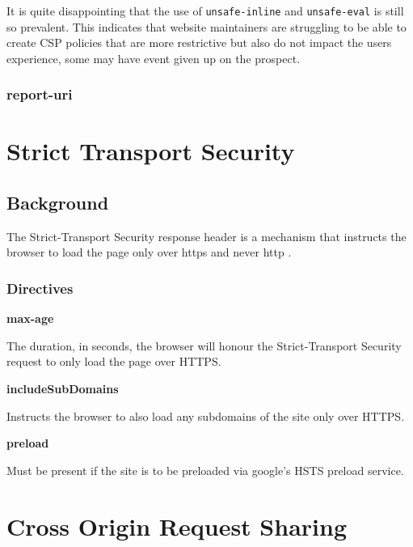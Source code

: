 \documentclass{mscreport}
\begin{document}
\vspace{0.3cm} \noindent
It is quite disappointing that the use of \texttt{unsafe-inline} and \texttt{unsafe-eval} is still so prevalent. This indicates that website maintainers are struggling to be able to create CSP policies that are more restrictive but also do not impact the users experience, some may have event given up on the prospect.

\subsubsection{report-uri}

\clearpage
\newpage


\section{Strict Transport Security}
\label{section:hsts}

\subsection{Background}

The Strict-Transport Security response header is a mechanism that instructs the browser to load the page only over https and never http \cite{Hodges2012-pe}.

\subsubsection{Directives}

\textbf{max-age}

\noindent
The duration, in seconds, the browser will honour the Strict-Transport Security request to only load the page over HTTPS.

\vspace{0.7cm} \noindent
\textbf{includeSubDomains}

\vspace{0.3cm} \noindent
Instructs the browser to also load any subdomains of the site only over HTTPS.

\vspace{0.7cm} \noindent
\textbf{preload}

\vspace{0.3cm} \noindent
Must be present if the site is to be preloaded via google's HSTS preload service.

\newpage

\section{Cross Origin Request Sharing}
\label{section:cors}
\end{document}
